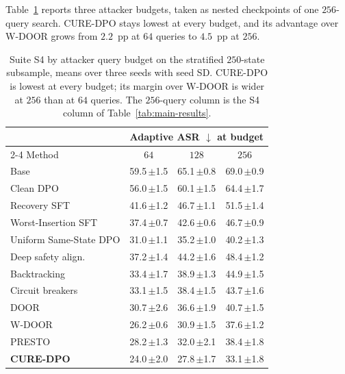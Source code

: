 \documentclass[11pt]{article}
\newcommand{\method}{CURE-DPO}
\newcommand{\asr}{ASR}
\begin{document}
Table~\ref{tab:s4-budget} reports three attacker budgets, taken as nested
checkpoints of one \(256\)-query search. \method{} stays lowest at every budget,
and its advantage over W-DOOR grows from \(2.2\)~pp at \(64\) queries to
\(4.5\)~pp at \(256\).

\begin{table}[t]
  \centering
  \scriptsize
  \setlength{\tabcolsep}{3pt}
  \begin{tabular}{lccc}
    \toprule
    & \multicolumn{3}{c}{Adaptive \asr{} \(\downarrow\) at budget} \\
    \cmidrule(lr){2-4}
    Method & \(64\) & \(128\) & \(256\) \\
    \midrule
    Base                        & 59.5\,{\scriptsize$\pm$1.5} & 65.1\,{\scriptsize$\pm$0.8} & 69.0\,{\scriptsize$\pm$0.9} \\
    Clean DPO                   & 56.0\,{\scriptsize$\pm$1.5} & 60.1\,{\scriptsize$\pm$1.5} & 64.4\,{\scriptsize$\pm$1.7} \\
    Recovery SFT                & 41.6\,{\scriptsize$\pm$1.2} & 46.7\,{\scriptsize$\pm$1.1} & 51.5\,{\scriptsize$\pm$1.4} \\
    Worst-Insertion SFT         & 37.4\,{\scriptsize$\pm$0.7} & 42.6\,{\scriptsize$\pm$0.6} & 46.7\,{\scriptsize$\pm$0.9} \\
    Uniform Same-State DPO      & 31.0\,{\scriptsize$\pm$1.1} & 35.2\,{\scriptsize$\pm$1.0} & 40.2\,{\scriptsize$\pm$1.3} \\
    \midrule
    Deep safety align.          & 37.2\,{\scriptsize$\pm$1.4} & 44.2\,{\scriptsize$\pm$1.6} & 48.4\,{\scriptsize$\pm$1.2} \\
    Backtracking                & 33.4\,{\scriptsize$\pm$1.7} & 38.9\,{\scriptsize$\pm$1.3} & 44.9\,{\scriptsize$\pm$1.5} \\
    Circuit breakers            & 33.1\,{\scriptsize$\pm$1.5} & 38.4\,{\scriptsize$\pm$1.5} & 43.7\,{\scriptsize$\pm$1.6} \\
    DOOR                        & 30.7\,{\scriptsize$\pm$2.6} & 36.6\,{\scriptsize$\pm$1.9} & 40.7\,{\scriptsize$\pm$1.5} \\
    W-DOOR                      & 26.2\,{\scriptsize$\pm$0.6} & 30.9\,{\scriptsize$\pm$1.5} & 37.6\,{\scriptsize$\pm$1.2} \\
    PRESTO                      & 28.2\,{\scriptsize$\pm$1.3} & 32.0\,{\scriptsize$\pm$2.1} & 38.4\,{\scriptsize$\pm$1.8} \\
    \midrule
    \textbf{\method{}}          & 24.0\,{\scriptsize$\pm$2.0} & 27.8\,{\scriptsize$\pm$1.7} & 33.1\,{\scriptsize$\pm$1.8} \\
    \bottomrule
  \end{tabular}
  \caption{Suite S4 by attacker query budget on the stratified \(250\)-state
  subsample, means over three seeds with seed SD. \method{} is lowest at every
  budget; its margin over W-DOOR is wider at \(256\) than at \(64\) queries.
  The \(256\)-query column is the
  S4 column of Table~\ref{tab:main-results}.}
  \label{tab:s4-budget}
\end{table}
\end{document}
